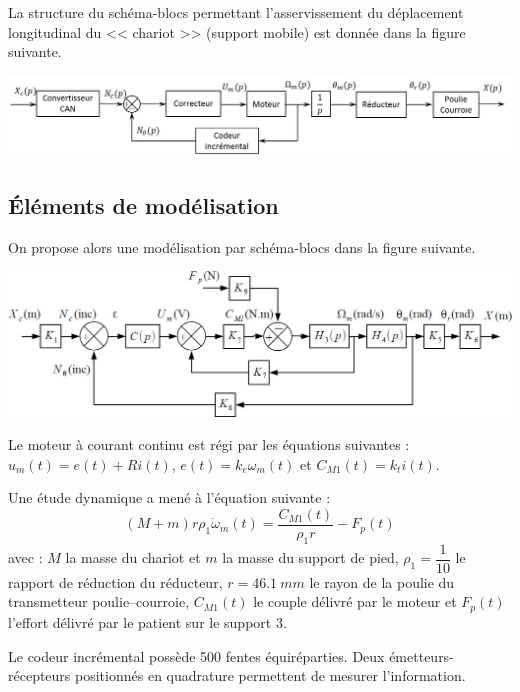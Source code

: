 \documentclass[10pt,fleqn]{article} %
\begin{document}
\begin{multicols}{2}
La structure du schéma-blocs permettant l'asservissement du déplacement longitudinal du << chariot >> (support mobile) est donnée dans la figure suivante.


\begin{center}
\includegraphics[width=\linewidth]{images/fig_03}
\end{center}

\subsection*{Éléments de modélisation}
On propose alors une modélisation par schéma-blocs dans la figure suivante. 
\begin{center}
\includegraphics[width=\linewidth]{images/fig_04}
\end{center}

Le moteur à courant continu est régi par les équations suivantes :
$ u_m(t)=e(t)+Ri(t)$, $e(t)=k_e\omega_m(t)$ et $C_{M1}(t)=k_t i(t)$. 

Une étude dynamique a mené à l'équation suivante : 
$$\left(M+m\right)r\rho_1 \dot{\omega}_m(t)=\dfrac{C_{M1}(t)}{\rho_1 r}-F_p(t)$$ avec : $M$ la masse du chariot et $m$ la masse du support de pied, $\rho_1=\dfrac{1}{10}$ le rapport de réduction du réducteur, $r=\SI{46,1}{mm}$ le rayon de la poulie du transmetteur poulie--courroie, $C_{M1}(t)$ le couple délivré par le moteur et $F_p(t)$ l'effort délivré par le patient sur le support 3. 

Le codeur incrémental possède 500 fentes équiréparties. Deux émetteurs-récepteurs positionnés en quadrature permettent de mesurer l'information. 


\end{multicols}
\end{document}
